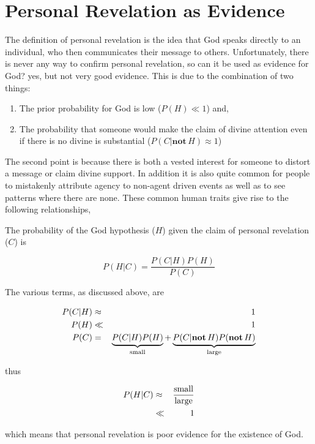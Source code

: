 \documentclass{tufte-book}
\begin{document}
\section{Personal Revelation as
Evidence}\label{personal-revelation-as-evidence}

The definition of personal revelation is the idea that God speaks
directly to an individual, who then communicates their message to
others. Unfortunately, there is never any way to confirm personal
revelation, so can it be used as evidence for God? yes, but not very
good evidence. This is due to the combination of two things:

\begin{enumerate}
\def\labelenumi{\arabic{enumi}.}
\itemsep1pt\parskip0pt
\item
  The prior probability for God is low (\(P(H)\ll 1\)) and,
\item
  The probability that someone would make the claim of divine attention
  even if there is no divine is substantial
  (\(P(C|\mathbf{not}\,H)\approx 1\))
\end{enumerate}

The second point is because there is both a vested interest for someone
to distort a message or claim divine support. In addition it is also
quite common for people to mistakenly attribute agency to non-agent
driven events as well as to see patterns where there are none. These
common human traits give rise to the following relationships,

The probability of the God hypothesis (\(H\)) given the claim of
personal revelation (\(C\)) is

\[P(H|C) = \frac{P(C|H)P(H)}{P(C)}\]

The various terms, as discussed above, are

\begin{eqnarray*}
P(C|H) &\approx& 1 \\
P(H) &\ll& 1 \\
P(C) &=& \underbrace{P(C|H)P(H)}_{\rm small} + \underbrace{P(C|\mathbf{not}\, H)P(\mathbf{not}\, H)}_{\rm large}
\end{eqnarray*}

thus

\begin{eqnarray*}
P(H|C) &\approx& \frac{\rm small}{\rm large}\\
&\ll& 1
\end{eqnarray*}

which means that personal revelation is poor evidence for the existence
of God.
\end{document}

